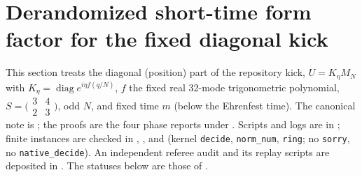 \section{Derandomized short-time form factor for the fixed diagonal kick}
\label{sec:derandomized-fixed-kick}
This section treats the diagonal (position) part of the repository kick,
\(U=K_\eta M_N\) with \(K_\eta=\operatorname{diag}e^{i\eta f(q/N)}\), \(f\) the fixed
real 32-mode trigonometric polynomial, \(S=\bigl(\begin{smallmatrix}3&4\\2&3\end{smallmatrix}\bigr)\),
odd \(N\), and fixed time \(m\) (below the Ehrenfest time).
The canonical note is ; the proofs are the four
phase reports under .
Scripts and logs are in ; finite instances are checked in
, ,  and
 (kernel \texttt{decide}, \texttt{norm\_num}, \texttt{ring}; no \texttt{sorry}, no \texttt{native\_decide}).
An independent referee audit and its replay scripts are deposited in
.
The statuses below are those of .


